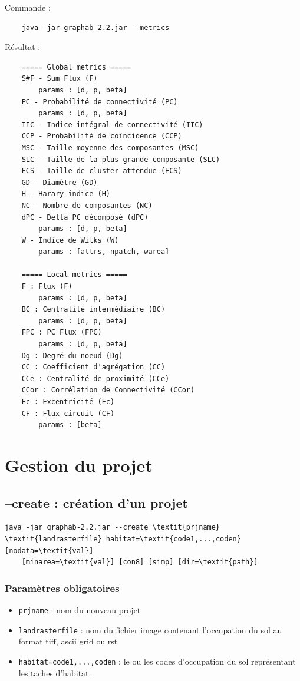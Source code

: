 \documentclass[a4paper,10pt]{report}
\begin{document}
Commande :
\begin{Verbatim}
	java -jar graphab-2.2.jar --metrics
\end{Verbatim}
Résultat :
\begin{Verbatim}
	===== Global metrics =====
	S#F - Sum Flux (F)
		params : [d, p, beta]
	PC - Probabilité de connectivité (PC)
		params : [d, p, beta]
	IIC - Indice intégral de connectivité (IIC)
	CCP - Probabilité de coïncidence (CCP)
	MSC - Taille moyenne des composantes (MSC)
	SLC - Taille de la plus grande composante (SLC)
	ECS - Taille de cluster attendue (ECS)
	GD - Diamètre (GD)
	H - Harary indice (H)
	NC - Nombre de composantes (NC)
	dPC - Delta PC décomposé (dPC)
		params : [d, p, beta]
	W - Indice de Wilks (W)
		params : [attrs, npatch, warea]
	
	===== Local metrics =====
	F : Flux (F)
		params : [d, p, beta]
	BC : Centralité intermédiaire (BC)
		params : [d, p, beta]
	FPC : PC Flux (FPC)
		params : [d, p, beta]
	Dg : Degré du noeud (Dg)
	CC : Coefficient d'agrégation (CC)
	CCe : Centralité de proximité (CCe)
	CCor : Corrélation de Connectivité (CCor)
	Ec : Excentricité (Ec)
	CF : Flux circuit (CF)
		params : [beta]

\end{Verbatim}

\section{Gestion du projet}

\subsection{--create : création d'un projet}

\begin{Verbatim}[commandchars=\\\{\}]
java -jar graphab-2.2.jar --create \textit{prjname} \textit{landrasterfile} habitat=\textit{code1,...,coden} [nodata=\textit{val}] 
	[minarea=\textit{val}] [con8] [simp] [dir=\textit{path}]
\end{Verbatim}

\subsubsection{Paramètres obligatoires}
\begin{itemize}
	\item \verb|prjname| : nom du nouveau projet
	\item \verb|landrasterfile| : nom du fichier image contenant l'occupation du sol au format tiff, ascii grid ou rst
	\item \verb|habitat=code1,...,coden| : le ou les codes d'occupation du sol représentant les taches d'habitat.
\end{itemize}
\end{document}
